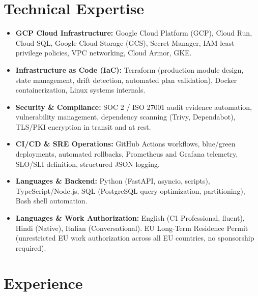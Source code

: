 \documentclass[10pt,a4paper]{article}
\begin{document}
\section{Technical Expertise}
\begin{itemize}
  \item \textbf{GCP Cloud Infrastructure:} Google Cloud Platform (GCP), Cloud Run, Cloud SQL, Google Cloud Storage (GCS), Secret Manager, IAM least-privilege policies, VPC networking, Cloud Armor, GKE.
  \item \textbf{Infrastructure as Code (IaC):} Terraform (production module design, state management, drift detection, automated plan validation), Docker containerization, Linux systems internals.
  \item \textbf{Security \& Compliance:} SOC 2 / ISO 27001 audit evidence automation, vulnerability management, dependency scanning (Trivy, Dependabot), TLS/PKI encryption in transit and at rest.
  \item \textbf{CI/CD \& SRE Operations:} GitHub Actions workflows, blue/green deployments, automated rollbacks, Prometheus and Grafana telemetry, SLO/SLI definition, structured JSON logging.
  \item \textbf{Languages \& Backend:} Python (FastAPI, asyncio, scripts), TypeScript/Node.js, SQL (PostgreSQL query optimization, partitioning), Bash shell automation.
  \item \textbf{Languages \& Work Authorization:} English (C1 Professional, fluent), Hindi (Native), Italian (Conversational). EU Long-Term Residence Permit (unrestricted EU work authorization across all EU countries, no sponsorship required).
\end{itemize}

\section{Experience}
\end{document}
